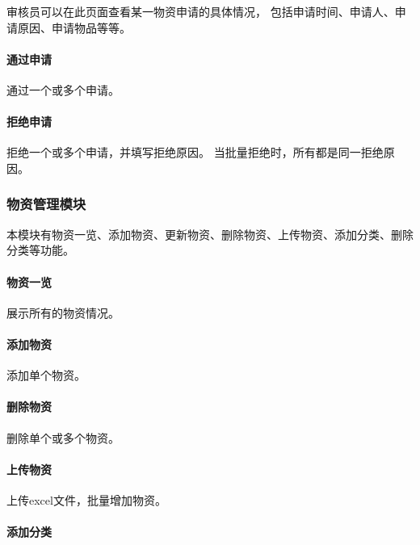 \documentclass[a4paper,fancyhdr,fntef,hyperref]{ctexart}
\begin{document}
审核员可以在此页面查看某一物资申请的具体情况，
包括申请时间、申请人、申请原因、申请物品等等。

\paragraph{通过申请}\label{ux901aux8fc7ux7533ux8bf7}

通过一个或多个申请。

\paragraph{拒绝申请}\label{ux62d2ux7eddux7533ux8bf7}

拒绝一个或多个申请，并填写拒绝原因。
当批量拒绝时，所有都是同一拒绝原因。

\subsubsection{物资管理模块}\label{ux7269ux8d44ux7ba1ux7406ux6a21ux5757}

本模块有物资一览、添加物资、更新物资、删除物资、上传物资、添加分类、删除分类等功能。

\paragraph{物资一览}\label{ux7269ux8d44ux4e00ux89c8}

展示所有的物资情况。

\paragraph{添加物资}\label{ux6dfbux52a0ux7269ux8d44}

添加单个物资。

\paragraph{删除物资}\label{ux5220ux9664ux7269ux8d44}

删除单个或多个物资。

\paragraph{上传物资}\label{ux4e0aux4f20ux7269ux8d44}

上传excel文件，批量增加物资。

\paragraph{添加分类}\label{ux6dfbux52a0ux5206ux7c7b}
\end{document}
